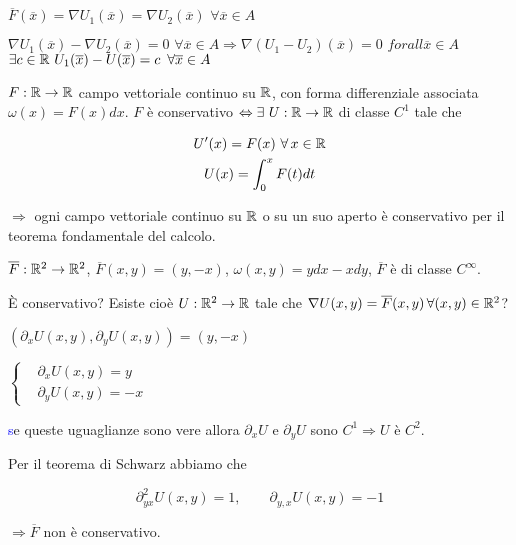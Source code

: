 \begin{exbar}
	\begin{center} 
		$\overline{F} (\overline{x})=\nabla U_1 (\overline{x})=\nabla U_2(\overline{x})\,\, \forall \overline{x}\in A $
		
		$\nabla U_1(\overline{x})-\nabla U_2(\overline{x})=0\,\,\forall \overline{x}\in A \Rightarrow \nabla(U_1-U_2)(\overline{x})=0 \,\, forall \overline{x}\in A$\\

		$\exists c \in \mathbb{R} \,\, U_1(\overline{x}) - U(\overline{x}) = c \,\,\, \forall \overline{x}\in A$
	\end{center}
\end{exbar}
	
	
$F:\mathbb{R}\rightarrow \mathbb{R}$ campo vettoriale continuo su $\mathbb{R}$, con forma differenziale associata $\omega(x)=F(x)dx$. $F$ è conservativo $\Leftrightarrow \exists \,\, U : \mathbb{R} \rightarrow \mathbb{R}$ di classe $C^1$ tale che 

\begin{gather*} 
	U'(x)=F(x)\,\, \forall \, x \in \mathbb{R}
	\\
	U(x)=\int_0^xF(t)dt
\end{gather*}

\begin{attbar}
	$ \Rightarrow$ ogni campo vettoriale continuo su $\mathbb{R}$ o su un suo aperto è conservativo per il teorema fondamentale del calcolo.
\end{attbar}


\begin{exbar}
\begin{example}
	\label{ex: pag 464}
	$\overline{F}:\mathbb{R}^2\rightarrow \mathbb{R}^2$, $\overline{F}(x,y)=(y,-x)$, $\omega (x,y)=ydx-xdy$, $\overline{F}$ è di classe $C^\infty$. 
	
	È conservativo? Esiste cioè $U:\mathbb{R}^2 \rightarrow \mathbb{R}$ tale che $\nabla U(x,y)=\overline{F}(x,y)\,\forall (x,y)\in \mathbb{R}^2$?
	
	$(\partial_xU(x,y),\partial_yU(x,y))=(y,-x)$
	
	$\begin{cases}
		&\partial_xU(x,y)=y\\
		&\partial_yU(x,y)=-x
	\end{cases}$
	
	{\textcolor{blue}se queste uguaglianze sono vere allora $\partial_xU$ e $\partial_yU$ sono $C^1 \Rightarrow U$ è $C^2$.}
	
	Per il teorema di Schwarz abbiamo che 
	
	$$\partial_{yx}^2U(x,y)=1, \qquad \partial_{y,x}U(x,y)=-1$$
	
	$\Rightarrow \overline{F}$ non è conservativo.
\end{example}
\end{exbar}


